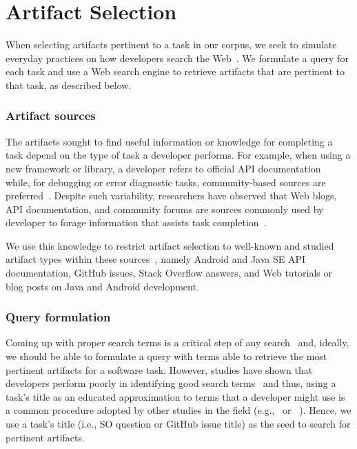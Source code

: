 
\section{Artifact Selection}
\label{cp4:corpus-artifacts}


When selecting artifacts pertinent to a task in our corpus, we seek to simulate everyday practices on how developers search the Web~\cite{rao2020, Xia2017}.
We formulate a query for each task and use a Web search engine to retrieve artifacts that are pertinent to that task, as described below.


\subsubsection{Artifact sources}



The artifacts sought to find useful information or knowledge for completing a task
 depend on the type of task a developer performs.
For example, when using a new framework or library, a developer refers to official API documentation~\cite{Li2013,robillard2011field} while, for debugging or error diagnostic tasks, community-based sources are preferred~\cite{Li2013,Breu2010}.
Despite such variability, researchers have observed that Web blogs, API documentation, and community forums are sources
commonly used by developer to forage information that assists task completion~\cite{Li2013, josyula2018}.



We use this knowledge to restrict artifact selection to well-known and studied artifact types within these sources~\cite{Starke2009,Kevic2014, Li2013}, namely Android and Java SE API documentation, GitHub issues, Stack Overflow answers, and Web tutorials or blog posts on Java and Android development.





\subsubsection{Query formulation}



Coming up with proper search terms is a critical step of any search~\cite{Haiduc2013}
and, ideally, we should be able to formulate a query with terms able to retrieve the most pertinent artifacts for a software task.
However, studies have shown that developers perform poorly in identifying good search terms~\cite{latoza2006, Starke2009,Kevic2014} and thus, using a task's title
as an educated approximation to terms that a developer might use is a common procedure adopted by other studies in the field (e.g.,~\cite{Xu2017} or ~\cite{silva2019}).
Hence, we use a task's title (i.e., SO question or GitHub issue title) as the seed to search for pertinent artifacts.



